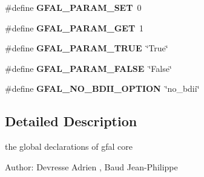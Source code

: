 \begin{CompactItemize}
\item 
\#define \textbf{GFAL\_\-PARAM\_\-SET}~0\label{gfal__constants_8h_8d6cea8cc3a7d3a797e0cc71b49b54b5}

\item 
\#define \textbf{GFAL\_\-PARAM\_\-GET}~1\label{gfal__constants_8h_87ac256399e97963fc1f886063d501e0}

\item 
\#define \textbf{GFAL\_\-PARAM\_\-TRUE}~\char`\"{}True\char`\"{}\label{gfal__constants_8h_0e60b5e9098e963993001610e63a9292}

\item 
\#define \textbf{GFAL\_\-PARAM\_\-FALSE}~\char`\"{}False\char`\"{}\label{gfal__constants_8h_42e1bfd7e5df56bf29df8968f28f1700}

\item 
\#define \textbf{GFAL\_\-NO\_\-BDII\_\-OPTION}~\char`\"{}no\_\-bdii\char`\"{}\label{gfal__constants_8h_992716aa0db1782d63f1fa57fd7f7d19}

\end{CompactItemize}


\subsection{Detailed Description}
the global declarations of gfal core \begin{Desc}
\item[Author:]Devresse Adrien , Baud Jean-Philippe \end{Desc}
